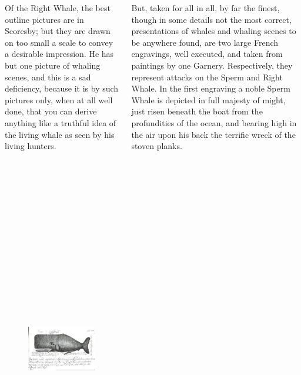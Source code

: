 \documentclass[final]{beamer}
\begin{document}
\begin{frame}{}
\begin{block}
\begin{columns}
\begin{column}{.49\textwidth}
\bigskip

Of the Right Whale, the best outline pictures are in Scoresby; but they are drawn on too small a scale to convey a desirable impression. He has but one picture of whaling scenes, and this is a sad deficiency, because it is by such pictures only, when at all well done, that you can derive anything like a truthful idea of the living whale as seen by his living hunters.

\begin{figure}
\includegraphics[height=17.0cm]{whale_4.jpeg}
\end{figure}

\end{column}

\begin{column}{.49\textwidth}

But, taken for all in all, by far the finest, though in some details not the most correct, presentations of whales and whaling scenes to be anywhere found, are two large French engravings, well executed, and taken from paintings by one Garnery. Respectively, they represent attacks on the Sperm and Right Whale. In the first engraving a noble Sperm Whale is depicted in full majesty of might, just risen beneath the boat from the profundities of the ocean, and bearing high in the air upon his back the terrific wreck of the stoven planks. 


\end{column}
\end{columns}
\end{block}
\end{frame}
\end{document}
